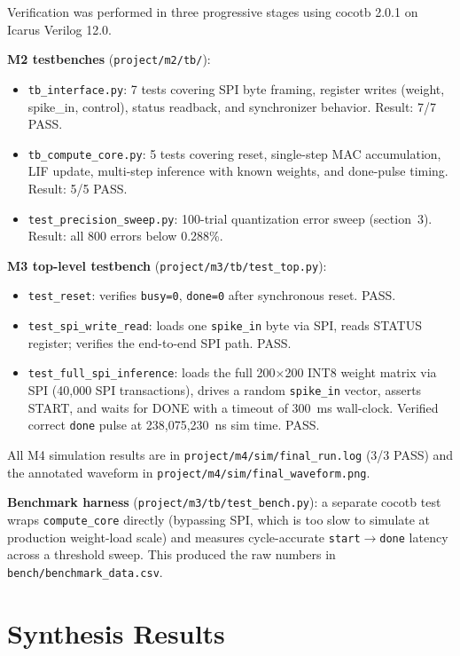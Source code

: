\documentclass[11pt,letterpaper]{article}
\begin{document}
Verification was performed in three progressive stages using cocotb 2.0.1
on Icarus Verilog 12.0.

\textbf{M2 testbenches} (\texttt{project/m2/tb/}):
\begin{itemize}
  \item \texttt{tb\_interface.py}: 7 tests covering SPI byte framing, register
    writes (weight, spike\_in, control), status readback, and synchronizer
    behavior. Result: 7/7 PASS.
  \item \texttt{tb\_compute\_core.py}: 5 tests covering reset, single-step
    MAC accumulation, LIF update, multi-step inference with known weights, and
    done-pulse timing. Result: 5/5 PASS.
  \item \texttt{test\_precision\_sweep.py}: 100-trial quantization error sweep
    (section~3). Result: all 800 errors below 0.288\%.
\end{itemize}

\textbf{M3 top-level testbench} (\texttt{project/m3/tb/test\_top.py}):
\begin{itemize}
  \item \texttt{test\_reset}: verifies \texttt{busy=0}, \texttt{done=0}
    after synchronous reset. PASS.
  \item \texttt{test\_spi\_write\_read}: loads one \texttt{spike\_in} byte via
    SPI, reads STATUS register; verifies the end-to-end SPI path. PASS.
  \item \texttt{test\_full\_spi\_inference}: loads the full 200$\times$200
    INT8 weight matrix via SPI (40,000 SPI transactions), drives a random
    \texttt{spike\_in} vector, asserts START, and waits for DONE with a
    timeout of 300~ms wall-clock. Verified correct \texttt{done} pulse at
    238,075,230~ns sim time. PASS.
\end{itemize}

All M4 simulation results are in \texttt{project/m4/sim/final\_run.log}
(3/3 PASS) and the annotated waveform in \texttt{project/m4/sim/final\_waveform.png}.

\textbf{Benchmark harness} (\texttt{project/m3/tb/test\_bench.py}): a separate
cocotb test wraps \texttt{compute\_core} directly (bypassing SPI, which is too
slow to simulate at production weight-load scale) and measures cycle-accurate
\texttt{start}$\to$\texttt{done} latency across a threshold sweep.
This produced the raw numbers in \texttt{bench/benchmark\_data.csv}.

\section{Synthesis Results}
\end{document}
